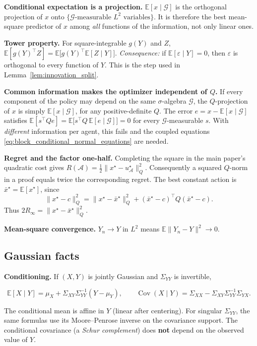\textbf{Conditional expectation is a projection.} $\mathbb E[x\mid\mathcal G]$ is the orthogonal projection of $x$ onto $\{\mathcal G\text{-measurable }L^2\text{ variables}\}$. It is therefore the best mean-square predictor of $x$ among \emph{all} functions of the information, not only linear ones.

\textbf{Tower property.} For square-integrable $g(Y)$ and $Z$, $\mathbb E[g(Y)^\top Z]=\mathbb E\big[g(Y)^\top\mathbb E[Z\mid Y]\big]$. \emph{Consequence:} if $\mathbb E[\varepsilon\mid Y]=0$, then $\varepsilon$ is orthogonal to every function of $Y$. This is the step used in Lemma~\ref{lem:innovation_split}.

\textbf{Common information makes the optimizer independent of $Q$.} If every component of the policy may depend on the same $\sigma$-algebra $\mathcal G$, the $Q$-projection of $x$ is simply $\mathbb E[x\mid\mathcal G]$, for any positive-definite $Q$. The error $e=x-\mathbb E[x\mid\mathcal G]$ satisfies $\mathbb E[s^\top Qe]=\mathbb E\big[s^\top Q\,\mathbb E[e\mid\mathcal G]\big]=0$ for every $\mathcal G$-measurable $s$. With \emph{different} information per agent, this fails and the coupled equations \eqref{eq:block_conditional_normal_equations} are needed.

\textbf{Regret and the factor one-half.} Completing the square in the main
paper's quadratic cost gives $R(\mathcal A)=\tfrac12\|x^\star-u^\star_{\mathcal A}\|_Q^2$.
Consequently a squared $Q$-norm in a proof equals twice the corresponding
regret. The best constant action is $\bar x^\star=\mathbb E[x^\star]$, since
\[
\|x^\star-c\|_Q^2=\|x^\star-\bar x^\star\|_Q^2+
(\bar x^\star-c)^\top Q(\bar x^\star-c).
\]
Thus $2R_\infty=\|x^\star-\bar x^\star\|_Q^2$.

\textbf{Mean-square convergence.} $Y_n\to Y$ in $L^2$ means $\mathbb E\|Y_n-Y\|^2\to0$.

\subsection{Gaussian facts}
\label{app:toolkit-3}
\textbf{Conditioning.} If $(X,Y)$ is jointly Gaussian and $\Sigma_{YY}$ is invertible,

\[
\mathbb E[X\mid Y]=\mu_X+\Sigma_{XY}\Sigma_{YY}^{-1}(Y-\mu_Y),\qquad \operatorname{Cov}(X\mid Y)=\Sigma_{XX}-\Sigma_{XY}\Sigma_{YY}^{-1}\Sigma_{YX}.
\]

  The conditional mean is affine in $Y$ (linear after centering). For singular
$\Sigma_{YY}$, the same formulas use its Moore--Penrose inverse on the covariance support. The conditional covariance (a \emph{Schur complement}) does \textbf{not} depend on the observed value of $Y$.

